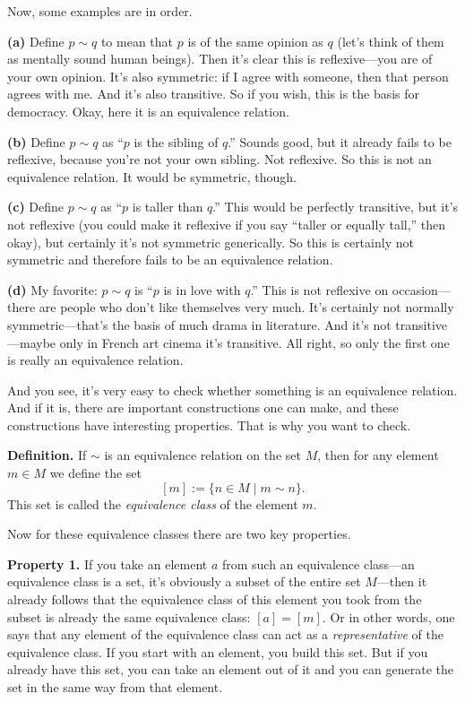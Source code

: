 Now, some examples are in order.

\textbf{(a)} Define $p \sim q$ to mean that $p$ is of the same opinion as $q$ (let's think of them as mentally sound human beings). Then it's clear this is reflexive---you are of your own opinion. It's also symmetric: if I agree with someone, then that person agrees with me. And it's also transitive. So if you wish, this is the basis for democracy. Okay, here it is an equivalence relation.

\textbf{(b)} Define $p \sim q$ as ``$p$ is the sibling of $q$.'' Sounds good, but it already fails to be reflexive, because you're not your own sibling. Not reflexive. So this is not an equivalence relation. It would be symmetric, though.

\textbf{(c)} Define $p \sim q$ as ``$p$ is taller than $q$.'' This would be perfectly transitive, but it's not reflexive (you could make it reflexive if you say ``taller or equally tall,'' then okay), but certainly it's not symmetric generically. So this is certainly not symmetric and therefore fails to be an equivalence relation.

\textbf{(d)} My favorite: $p \sim q$ is ``$p$ is in love with $q$.'' This is not reflexive on occasion---there are people who don't like themselves very much. It's certainly not normally symmetric---that's the basis of much drama in literature. And it's not transitive---maybe only in French art cinema it's transitive. All right, so only the first one is really an equivalence relation.

And you see, it's very easy to check whether something is an equivalence relation. And if it is, there are important constructions one can make, and these constructions have interesting properties. That is why you want to check.

\textbf{Definition.} If $\sim$ is an equivalence relation on the set $M$, then for any element $m \in M$ we define the set
\[
[m] := \{ n \in M \mid m \sim n \}.
\]
This set is called the \emph{equivalence class} of the element $m$.

Now for these equivalence classes there are two key properties.

\textbf{Property 1.} If you take an element $a$ from such an equivalence class---an equivalence class is a set, it's obviously a subset of the entire set $M$---then it already follows that the equivalence class of this element you took from the subset is already the same equivalence class: $[a] = [m]$. Or in other words, one says that any element of the equivalence class can act as a \emph{representative} of the equivalence class. If you start with an element, you build this set. But if you already have this set, you can take an element out of it and you can generate the set in the same way from that element.

